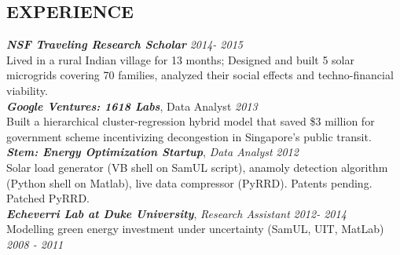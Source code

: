 \documentclass[margin]{res}
\begin{document}
\begin{resume}
\section{EXPERIENCE} 
{\sl \bf NSF Traveling Research Scholar} \hfill {\it 2014- 2015}\\
Lived in a rural Indian village for 13 months; Designed and built 5 solar microgrids covering 70 families, analyzed their social effects and techno-financial viability.\\
{\sl \bf Google Ventures: 1618 Labs}, Data Analyst \hfill {\it 2013} \\
			Built a hierarchical cluster-regression hybrid model that saved \$3 million for government scheme incentivizing decongestion in Singapore's public transit.\\ 
{\sl \bf Stem: Energy Optimization Startup}, {\sl Data Analyst} \hfill{ \it 2012}\\
				Solar load generator (VB shell on SamUL script), anamoly detection algorithm (Python shell on Matlab), live data compressor (PyRRD). Patents pending. Patched PyRRD.\\
				{\sl \bf Echeverri Lab at Duke University}, {\sl Research Assistant} \hfill {\it 2012- 2014}\\
				Modelling green energy investment under uncertainty (SamUL, UIT, MatLab) %
                  \hfill {\it 2008 - 2011} 
               

\end{resume}
\end{document}
